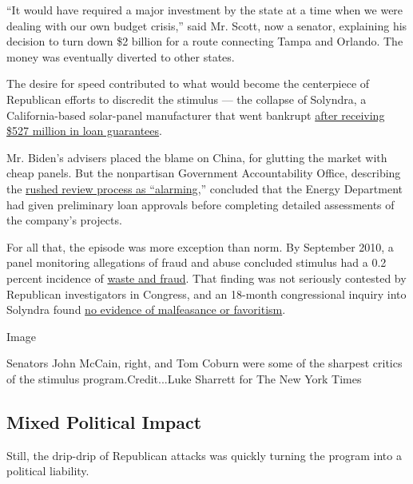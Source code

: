 ``It would have required a major investment by the state at a time when
we were dealing with our own budget crisis,'' said Mr. Scott, now a
senator, explaining his decision to turn down \$2 billion for a route
connecting Tampa and Orlando. The money was eventually diverted to other
states.

The desire for speed contributed to what would become the centerpiece of
Republican efforts to discredit the stimulus --- the collapse of
Solyndra, a California-based solar-panel manufacturer that went bankrupt
\href{https://www.nytimes3xbfgragh.onion/2011/09/01/business/energy-environment/solyndra-solar-firm-aided-by-federal-loans-shuts-doors.html}{after
receiving \$527 million in loan guarantees}.

Mr. Biden's advisers placed the blame on China, for glutting the market
with cheap panels. But the nonpartisan Government Accountability Office,
describing the
\href{https://www.nytimes3xbfgragh.onion/2011/09/23/us/politics/in-rush-to-assist-solyndra-united-states-missed-warning-signs.html}{rushed
review process as ``alarming},'' concluded that the Energy Department
had given preliminary loan approvals before completing detailed
assessments of the company's projects.

For all that, the episode was more exception than norm. By September
2010, a panel monitoring allegations of fraud and abuse concluded
stimulus had a 0.2 percent incidence of
\href{https://obamawhitehouse.archives.gov/the-press-office/2010/10/01/vice-president-biden-delivers-new-report-president-recovery-act-progress}{waste
and fraud}. That finding was not seriously contested by Republican
investigators in Congress, and an 18-month congressional inquiry into
Solyndra found
\href{https://thehill.com/policy/energy-environment/241869-gop-report-solyndra-collapse-a-cautionary-tale-of-political-pressures}{no
evidence of malfeasance or favoritism}.

Image

Senators John McCain, right, and Tom Coburn were some of the sharpest
critics of the stimulus program.Credit...Luke Sharrett for The New York
Times

\hypertarget{mixed-political-impact}{%
\subsection{Mixed Political Impact}\label{mixed-political-impact}}

Still, the drip-drip of Republican attacks was quickly turning the
program into a political liability.

